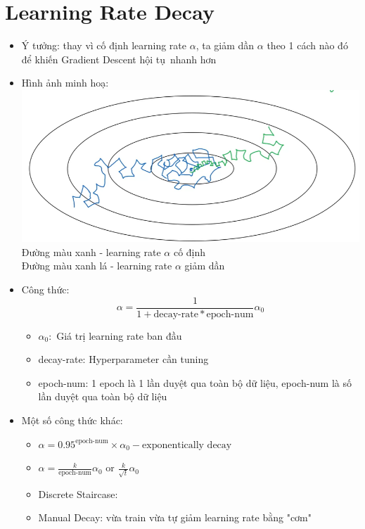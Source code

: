 \documentclass[12pt,a4paper]{report}
\begin{document}
	\section{Learning Rate Decay}
		\begin{itemize}
			\item Ý tưởng: thay vì cố định learning rate $ \alpha $, ta giảm dần $ \alpha $ theo 1 cách nào đó để khiến Gradient Descent hội tụ\ nhanh hơn
			\item Hình ảnh minh hoạ:\\
				\includegraphics[scale=0.5]{4}\\
				\tabto{0.5cm} Đường màu xanh - learning rate $ \alpha $ cố định\\
				\tabto{0.5cm} Đường màu xanh lá - learning rate $ \alpha $ giảm dần
			\item Công thức:
				\begin{equation*}
				\alpha = \frac{1}{1 + \text{decay-rate} * \text{epoch-num}} \alpha_0
				\end{equation*}
				\begin{itemize}
					\item $ \alpha_0: $ Giá trị learning rate ban đầu
					\item decay-rate: Hyperparameter cần tuning
					\item epoch-num: 1 epoch là 1 lần duyệt qua toàn bộ dữ liệu, epoch-num là số 	lần duyệt qua toàn bộ dữ liệu
				\end{itemize}
			\item Một số công thức khác:
				\begin{itemize}
					\item $ \alpha = 0.95^{\text{epoch-num}} \times \alpha_0 - \text{exponentically decay} $
					\item $ \alpha = \frac{k}{\text{epoch-num}}\alpha_0 $ or $ \frac{k}{\sqrt{t}}\alpha_0 $
					\item Discrete Staircase:\\
					\item Manual Decay: vừa train vừa tự giảm learning rate bằng "cơm"
				\end{itemize}
		\end{itemize}
\end{document}
